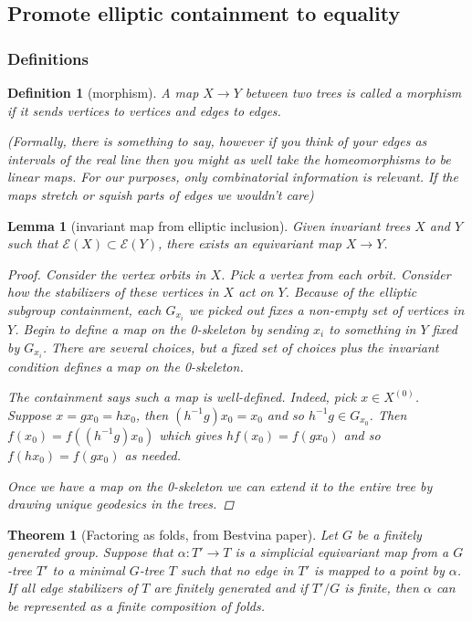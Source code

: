 \documentclass{article}
\theoremstyle{mystyle}
\newtheorem{thm}{Theorem}[section]
\newtheorem{lem}{Lemma}[section]
\newtheorem{defn}{Definition}
\theoremstyle{remark}
\begin{document}
\subsection{Promote elliptic containment to equality}
\subsubsection{Definitions}
\begin{defn}[morphism]
A map $X\to Y$ between two trees is called a morphism if it sends vertices to vertices and edges to edges. 

(Formally, there is something to say, however if you think of your edges as intervals of the real line then you might as well take the homeomorphisms to be linear maps. For our purposes, only combinatorial information is relevant. If the maps stretch or squish parts of edges we wouldn't care)
\end{defn}

\begin{lem}[invariant map from elliptic inclusion]
Given invariant trees $X$ and $Y$ such that $\mathcal{E}(X)\subset\mathcal{E}(Y)$, there exists an equivariant map $X\to Y$.
 
 \begin{proof}
 Consider the vertex orbits in $X$. Pick a vertex from each orbit. Consider how the stabilizers of these vertices in $X$ act on $Y$. Because of the elliptic subgroup containment, each $G_{x_i}$ we picked out fixes a non-empty set of vertices in $Y$. Begin to define a map on the 0-skeleton by sending $x_i$ to something in $Y$ fixed by $G_{x_i}$. There are several choices, but a fixed set of choices plus the invariant condition defines a map on the 0-skeleton.
 
The containment says such a map is well-defined. Indeed, pick $x \in X^{(0)}$. Suppose $x=gx_0=hx_0$, then $(h^{-1}g)x_0 = x_0$ and so $h^{-1}g \in G_{x_0}$. Then $f(x_0)=f( (h^{-1}g)x_0)$ which gives $h f(x_0) = f(gx_0)$ and so $f(hx_0)=f(gx_0)$ as needed.
 
 Once we have a map on the 0-skeleton we can extend it to the entire tree by drawing unique geodesics in the trees.
\end{proof}
\end{lem}

\begin{thm}[Factoring as folds, from Bestvina paper]
Let $G$ be a finitely generated group. Suppose that $\alpha: T'\to T$ is a simplicial equivariant map from a $G$-tree $T'$ to a minimal $G$-tree $T$ such that no edge in $T'$ is mapped to a point by $\alpha$. If all edge stabilizers of $T$ are finitely generated and if $T'/G$ is finite, then $\alpha$ can be represented as a finite composition of folds.
\end{thm}
\end{document}

